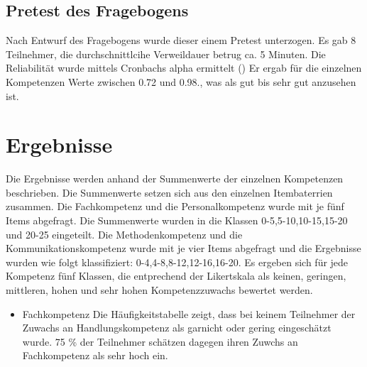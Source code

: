 \documentclass[12pt, bibliography=totoc]{scrartcl}
\begin{document}
\subsection{Pretest des Fragebogens}\label{pretest-des-fragebogens}

Nach Entwurf des Fragebogens wurde dieser einem Pretest unterzogen. Es
gab 8 Teilnehmer, die durchschnittlcihe Verweildauer betrug ca. 5
Minuten. Die Reliabilität wurde mittels Cronbachs alpha ermittelt
(\textcite{Wassa}) Er ergab für die einzelnen Kompetenzen Werte zwischen
0.72 und 0.98., was als gut bis sehr gut anzusehen ist.

\section{Ergebnisse}\label{ergebnisse}

Die Ergebnisse werden anhand der Summenwerte der einzelnen Kompetenzen
beschrieben. Die Summenwerte setzen sich aus den einzelnen Itembaterrien
zusammen. Die Fachkompetenz und die Personalkompetenz wurde mit je fünf
Items abgefragt. Die Summenwerte wurden in die Klassen
0-5,5-10,10-15,15-20 und 20-25 eingeteilt. Die Methodenkompetenz und die
Kommunikationskompetenz wurde mit je vier Items abgefragt und die
Ergebnisse wurden wie folgt klassifiziert: 0-4,4-8,8-12,12-16,16-20. Es
ergeben sich für jede Kompetenz fünf Klassen, die entprechend der
Likertskala als keinen, geringen, mittleren, hohen und sehr hohen
Kompetenzzuwachs bewertet werden.

\begin{itemize}
\tightlist
\item
  Fachkompetenz Die Häufigkeitstabelle zeigt, dass bei keinem Teilnehmer
  der Zuwachs an Handlungskompetenz als garnicht oder gering
  eingeschätzt wurde. 75 \% der Teilnehmer schätzen dagegen ihren Zuwchs
  an Fachkompetenz als sehr hoch ein.
\end{itemize}
\end{document}
